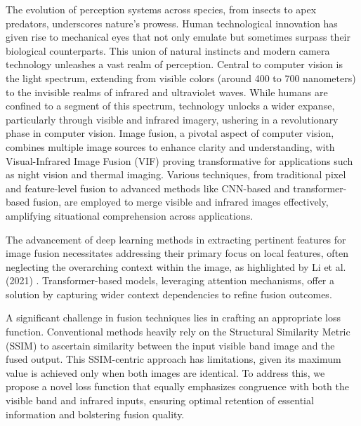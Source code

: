 The evolution of perception systems across species, from insects to apex predators, underscores nature's prowess. Human technological innovation has given rise to mechanical eyes that not only emulate but sometimes surpass their biological counterparts. This union of natural instincts and modern camera technology unleashes a vast realm of perception. Central to computer vision is the light spectrum, extending from visible colors (around 400 to 700 nanometers) to the invisible realms of infrared and ultraviolet waves. While humans are confined to a segment of this spectrum, technology unlocks a wider expanse, particularly through visible and infrared imagery, ushering in a revolutionary phase in computer vision. Image fusion, a pivotal aspect of computer vision, combines multiple image sources to enhance clarity and understanding, with Visual-Infrared Image Fusion (VIF) proving transformative for applications such as night vision and thermal imaging. Various techniques, from traditional pixel and feature-level fusion to advanced methods like CNN-based and transformer-based fusion, are employed to merge visible and infrared images effectively, amplifying situational comprehension across applications.

The advancement of deep learning methods in extracting pertinent features for image fusion necessitates addressing their primary focus on local features, often neglecting the overarching context within the image, as highlighted by Li et al. (2021) \cite{li2021rfn}. Transformer-based models, leveraging attention mechanisms, offer a solution by capturing wider context dependencies to refine fusion outcomes.

A significant challenge in fusion techniques lies in crafting an appropriate loss function. Conventional methods heavily rely on the Structural Similarity Metric (SSIM) to ascertain similarity between the input visible band image and the fused output. This SSIM-centric approach has limitations, given its maximum value is achieved only when both images are identical. To address this, we propose a novel loss function that equally emphasizes congruence with both the visible band and infrared inputs, ensuring optimal retention of essential information and bolstering fusion quality.

